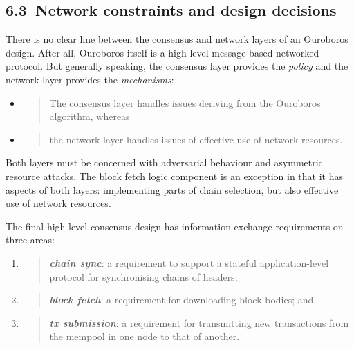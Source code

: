 \documentclass[11pt,a4paper]{article}
\begin{document}
\hypertarget{network-constraints-and-design-decisions}{%
\subsection{​6.3​~Network constraints and design
decisions}\label{network-constraints-and-design-decisions}}

There is no clear line between the consensus and network layers of an
Ouroboros design. After all, Ouroboros itself is a high-level
message-based networked protocol. But generally speaking, the consensus
layer provides the \emph{policy} and the network layer provides the
\emph{mechanisms}:

\begin{itemize}
\item
  \begin{quote}
  The consensus layer handles issues deriving from the Ouroboros
  algorithm, whereas
  \end{quote}
\item
  \begin{quote}
  the network layer handles issues of effective use of network
  resources.
  \end{quote}
\end{itemize}

Both layers must be concerned with adversarial behaviour and asymmetric
resource attacks. The block fetch logic component is an exception in
that it has aspects of both layers: implementing parts of chain
selection, but also effective use of network resources.

The final high level consensus design has information exchange
requirements on three areas:

\begin{enumerate}
\def\labelenumi{\arabic{enumi}.}
\item
  \begin{quote}
  \emph{\textbf{chain sync}}: a requirement to support a stateful
  application-level protocol for synchronising chains of headers;
  \end{quote}
\item
  \begin{quote}
  \emph{\textbf{block fetch}}: a requirement for downloading block
  bodies; and
  \end{quote}
\item
  \begin{quote}
  \emph{\textbf{tx submission}}: a requirement for transmitting new
  transactions from the mempool in one node to that of another.
  \end{quote}
\end{enumerate}
\end{document}
